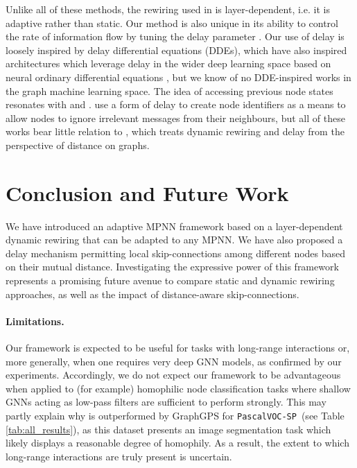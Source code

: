 \documentclass{article}
\newcommand{\voc}{\texttt{PascalVOC-SP}}
\theoremstyle{plain}
\theoremstyle{definition}
\theoremstyle{remark}
\begin{document}
Unlike all of these methods, the rewiring used in  is layer-dependent, i.e. it is adaptive rather than static. Our method is also unique in its ability to control the rate of information flow by tuning the delay parameter . Our use of delay is loosely inspired by delay differential equations (DDEs), which have also inspired architectures which leverage delay in the wider deep learning space \citep{anumasa2021delay, zhu2021neural, zhu2022neural} based on neural ordinary differential equations \cite{chen2018neural}, but we know of no DDE-inspired works in the graph machine learning space.
The idea of accessing previous node states resonates with \citet{xu2018representation} and \citet{strathmann2021persistent}.  \citet{faber2022asynchronous} use a form of delay to create node identifiers as a means to allow nodes to ignore irrelevant messages from their neighbours, but all of these works bear little relation to , which treats dynamic rewiring and delay from the perspective of distance on graphs.

















\section{Conclusion and Future Work}
We have introduced an adaptive MPNN framework based on a layer-dependent dynamic rewiring that can be adapted to any MPNN. We have also proposed a delay mechanism permitting local skip-connections among different nodes based on their mutual distance. Investigating the expressive power of this framework represents a promising future avenue to compare static and dynamic rewiring approaches, as well as the impact of distance-aware skip-connections.

\vspace{-1mm}

\paragraph{Limitations.}
Our framework is expected to be useful for tasks with long-range interactions or, more generally, when one requires very deep GNN models, as confirmed by our experiments. Accordingly, we do not expect our framework to be advantageous when applied to (for example) homophilic node classification tasks where shallow GNNs acting as low-pass filters are sufficient to perform strongly. This may partly explain why  is outperformed by GraphGPS for \voc\ (see Table \ref{tab:all_results}), as this dataset presents an image segmentation task which likely displays a reasonable degree of homophily. As a result, the extent to which long-range interactions are truly present is uncertain.
\end{document}
